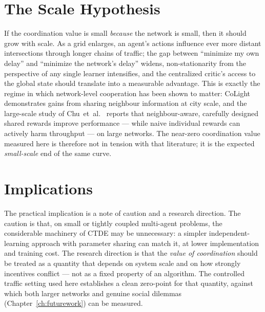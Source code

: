 \section{The Scale Hypothesis}
If the coordination value is small \emph{because} the network is small, then it
should grow with scale. As a grid enlarges, an agent's actions influence ever more
distant intersections through longer chains of traffic; the gap between ``minimize
my own delay'' and ``minimize the network's delay'' widens, non-stationarity from
the perspective of any single learner intensifies, and the centralized critic's
access to the global state should translate into a measurable advantage. This is
exactly the regime in which network-level cooperation has been shown to
matter: CoLight~\cite{wei2019colight} demonstrates gains from sharing neighbour
information at city scale, and the large-scale study of
Chu~et~al.~\cite{chu2020largescale} reports that neighbour-aware, carefully designed
shared rewards improve performance --- while naive individual rewards can actively
harm throughput --- on large networks. The near-zero coordination value measured here
is therefore not in tension with that literature; it is the expected
\emph{small-scale} end of the same curve.

\section{Implications}
The practical implication is a note of caution and a research direction. The caution
is that, on small or tightly coupled multi-agent problems, the considerable
machinery of CTDE may be unnecessary: a simpler independent-learning approach with
parameter sharing can match it, at lower implementation and training cost. The
research direction is that the \emph{value of coordination} should be treated as a
quantity that depends on system scale and on how strongly incentives conflict ---
not as a fixed property of an algorithm. The controlled traffic setting used here
establishes a clean zero-point for that quantity, against which both larger networks
and genuine social dilemmas (Chapter~\ref{ch:futurework}) can be measured.
